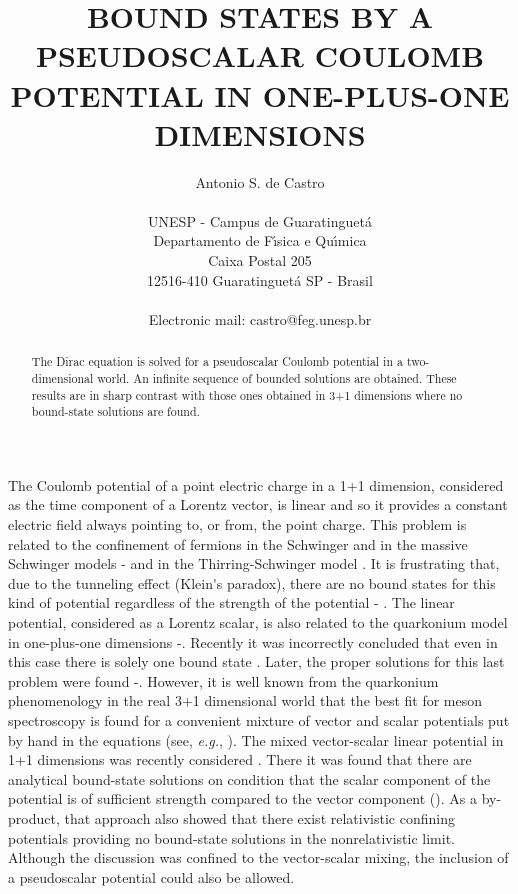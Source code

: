 \documentclass[a4paper,12pt,titlepage]{article}
\begin{document}
\title{BOUND STATES BY A PSEUDOSCALAR COULOMB POTENTIAL IN ONE-PLUS-ONE DIMENSIONS}
\date{}
\author{Antonio S. de Castro \\
\\
UNESP - Campus de Guaratinguet\'{a}\\
Departamento de F\'{\i}sica e Qu\'{\i}mica\\
Caixa Postal 205\\
12516-410 Guaratinguet\'{a} SP - Brasil\\
\\
Electronic mail: castro@feg.unesp.br}
\maketitle

\begin{abstract}
The Dirac equation is solved for a pseudoscalar Coulomb potential in a
two-dimensional world. An infinite sequence of bounded solutions are
obtained. These results are in sharp contrast with those ones obtained in
3+1 dimensions where no bound-state solutions are found.
\end{abstract}

The Coulomb potential of a point electric charge in a 1+1 dimension,
considered as the time component of a Lorentz vector, is linear and so it
provides a constant electric field always pointing to, or from, the point
charge. This problem is related to the confinement of fermions in the
Schwinger and in the massive Schwinger models \cite{col1}-\cite{col2} and in
the Thirring-Schwinger model \cite{fro}. It is frustrating that, due to the
tunneling effect (Klein\'{}s paradox), there are no bound states for this
kind of potential regardless of the strength of the potential \cite{cap}-%
\cite{gal}. The linear potential, considered as a Lorentz scalar, is also
related to the quarkonium model in one-plus-one dimensions \cite{hoo}-\cite
{kog}. Recently it was incorrectly concluded that even in this case there is
solely one bound state \cite{bha}. Later, the proper solutions for this last
problem were found \cite{cas}-\cite{hil}. However, it is well known from the
quarkonium phenomenology in the real 3+1 dimensional world that the best fit
for meson spectroscopy is found for a convenient mixture of vector and
scalar potentials put by hand in the equations (see, \textit{e.g.}, \cite
{luc}). The mixed vector-scalar linear potential in 1+1 dimensions was
recently considered \cite{asc1}. There it was found that there are
analytical bound-state solutions on condition that the scalar component of
the potential is of sufficient strength compared to the vector component (\coordHE{}). As a by-product, that approach also showed that there
exist relativistic confining potentials providing no bound-state solutions
in the nonrelativistic limit. Although the discussion was confined to the
vector-scalar mixing, the inclusion of a pseudoscalar potential could also
be allowed.
\end{document}
